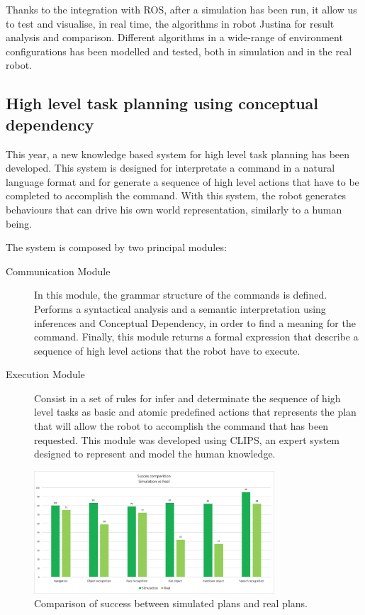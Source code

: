 \documentclass{llncs}
\begin{document}
Thanks to the integration with ROS, after a simulation has been run, it allow us to test and visualise, in real time, the algorithms in robot Justina for result analysis and comparison. Different algorithms in a wide-range of environment configurations has been modelled and tested, both in simulation and in the real robot. 

\subsection{High level task planning using conceptual dependency}\label{subsec:ActionPln}
This year, a new knowledge based system for high level task planning has been developed. This system is designed for interpretate a command in a natural language format and for generate a sequence of high level  actions that have to be completed to accomplish the command. With this system, the robot generates behaviours that can drive his own world representation, similarly to a human being. 

The system is composed by two principal modules:
\begin{description}
\item[Communication Module] In this module, the grammar structure of the commands is defined. Performs a syntactical analysis and a semantic interpretation using inferences and Conceptual Dependency, in order to find a meaning for the command. Finally, this module returns a formal expression that describe a sequence of high level actions that the robot have to execute. 
\item[Execution Module] Consist in a set of rules for infer and determinate the sequence of high level tasks as  basic and atomic predefined actions that represents the plan that will allow the robot to accomplish the command that has been requested. This module was developed using CLIPS, an expert system designed to represent and model the human knowledge.
\end{description}

\begin{figure}[H]
	\centering
	\includegraphics[width=0.8\textwidth]{Figures/taskPlanning.png}
	\caption{Comparison of success between simulated plans and real plans.}
	\label{fig:taskPlanning}
\end{figure}
\end{document}
